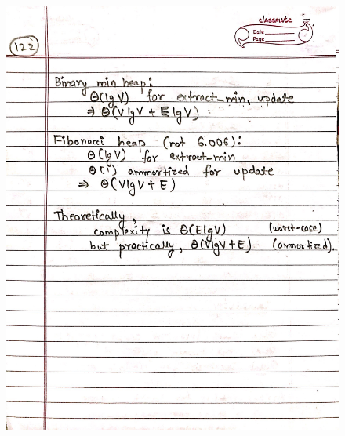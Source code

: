 \begin{figure}[H]
    \centering
    \includegraphics[width=16cm, height=21cm]{"./MIT-6.006/MIT-6006-122"}
\end{figure}
\newpage
